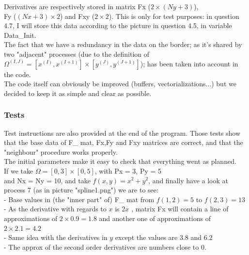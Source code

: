 \documentclass[10pt]{article}
\begin{document}
Derivatives are respectively stored in matrix Fx ($2 \times (Ny+3)$),\\ Fy ($ (Nx+3) \times 2$) and Fxy ($2 \times 2$). This is only for test purposes: in question 4.7, I will store this data according to the picture in question 4.5, in variable Data\_Init.\\

The fact that we have a redundancy in the data on the border;  as it's shared by two "adjacent" processes (due to the definition of\\ $\Omega^{(I,J)} = [x^{(I)}, x^{(I+1)}] \times [y^{(J)}, y^{(J+1)}] $); has been taken into account in the code.\\

The code itself can obviously be improved (buffers, vectorializations...) but we decided to keep it as simple and clear as possible.


\subsubsection{Tests}


Test instructions are also provided at the end of the program. Those tests show that the base data of F\_ mat, Fx,Fy and Fxy matrices are correct, and that the "neighbour" procedure works properly.\\

The initial parameters make it easy to check that everything went as planned.\\


If we take $\Omega = [0,3] \times [0,5]$, with Px = 3, Py = 5 \\and Nx = Ny = 10, and take $f(x,y) = x^2 + y^2$, and finally have a look at process 7 (as in picture "spline1.png") we are to see:\\

- Base values in (the "inner part" of) F\_ mat from $f(1,2)=5$ to $f(2,3)=13$\\

- As the derivative with regards to $x$ is $2x$ , matrix Fx will contain a line of approximations  of $2 \times 0.9 = 1.8 $ and another one of approximations of $2 \times 2.1 = 4.2 $\\

- Same idea with the derivatives in $y$ except the values are $3.8$ and $6.2$\\

- The approx of the second order derivatives are numbers close to 0.\\
\end{document}
